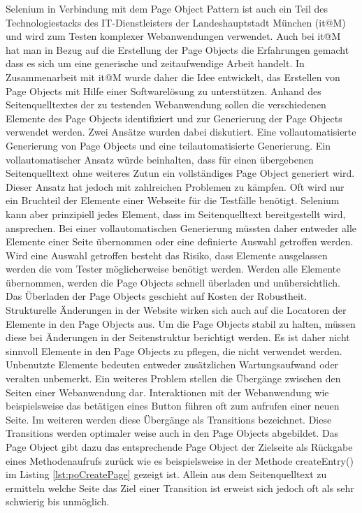 Selenium in Verbindung mit dem Page Object Pattern ist auch ein Teil des Technologiestacks des IT-Dienstleisters der Landeshauptstadt München (it@M) und wird zum Testen komplexer Webanwendungen verwendet. Auch bei it@M hat man in Bezug auf die Erstellung der Page Objects die Erfahrungen gemacht dass es sich um eine generische und zeitaufwendige Arbeit handelt.
In Zusammenarbeit mit it@M wurde daher die Idee entwickelt, das Erstellen von Page Objects mit Hilfe einer Softwarelösung zu unterstützen. 
Anhand des Seitenquelltextes der zu testenden Webanwendung sollen die verschiedenen Elemente des Page Objects identifiziert und zur Generierung der Page Objects verwendet werden.
Zwei Ansätze wurden dabei diskutiert. Eine vollautomatisierte Generierung von Page Objects und eine teilautomatisierte Generierung.
Ein vollautomatischer Ansatz würde beinhalten, dass für einen übergebenen Seitenquelltext ohne weiteres Zutun ein vollständiges Page Object generiert wird. Dieser Ansatz hat jedoch mit zahlreichen Problemen zu kämpfen. Oft wird nur ein Bruchteil der Elemente einer Webseite für die Testfälle benötigt. Selenium kann aber prinzipiell jedes Element, dass im Seitenquelltext bereitgestellt wird, ansprechen. Bei einer vollautomatischen Generierung müssten daher entweder alle Elemente einer Seite übernommen oder eine definierte Auswahl getroffen werden.
Wird eine Auswahl getroffen besteht das Risiko, dass Elemente ausgelassen werden die vom Tester möglicherweise benötigt werden. Werden alle Elemente übernommen, werden die Page Objects schnell überladen und unübersichtlich. Das Überladen der Page Objects geschieht auf Kosten der Robustheit. Strukturelle Änderungen in der Website wirken sich auch auf die Locatoren der Elemente in den Page Objects aus. Um die Page Objects stabil zu halten, müssen diese bei Änderungen in der Seitenstruktur berichtigt werden.
Es ist daher nicht sinnvoll Elemente in den Page Objects zu pflegen, die nicht verwendet werden. Unbenutzte Elemente bedeuten entweder zusätzlichen Wartungsaufwand oder veralten unbemerkt.
Ein weiteres Problem stellen die Übergänge zwischen den Seiten einer Webanwendung dar. Interaktionen mit der Webanwendung wie beispielsweise das betätigen eines Button führen oft zum aufrufen einer neuen Seite. Im weiteren werden diese Übergänge als Transitions bezeichnet. Diese Transitions werden optimaler weise auch in den Page Objects abgebildet. Das Page Object gibt dazu das entsprechende Page Object der Zielseite als Rückgabe eines Methodenaufrufs zurück wie es beispielsweise in der Methode createEntry() im Listing \ref{lst:poCreatePage} gezeigt ist. Allein aus dem Seitenquelltext zu ermitteln welche Seite das Ziel einer Transition ist erweist sich jedoch oft als sehr schwierig bis unmöglich.
